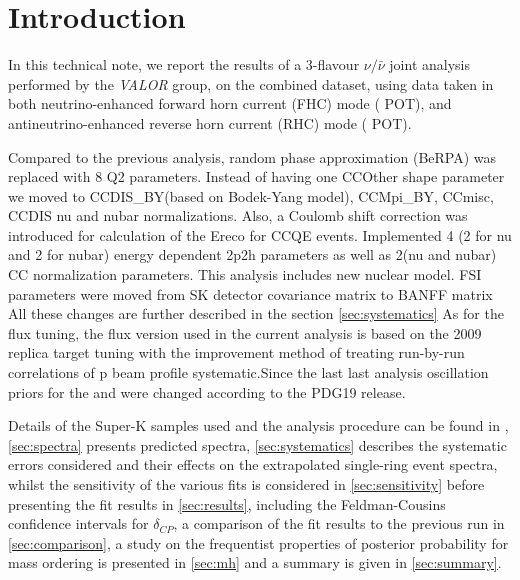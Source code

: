 
\section {Introduction}
\label{sec:intro}
In this technical note, we report the results of a 3-flavour $\nu/\bar{\nu}$ joint analysis performed by the {\em VALOR} group, on the combined \RunPeriod dataset, using data taken in both neutrino-enhanced forward horn current (FHC) mode (\TotalPotNu{} POT), and antineutrino-enhanced reverse horn current (RHC) mode (\TotalPotNuBar{} POT).


Compared to the previous analysis, random phase approximation  (BeRPA) was replaced with 8 Q2 parameters. Instead of having one CCOther shape parameter we moved to CCDIS_BY(based on Bodek-Yang model), CCMpi_BY, CCmisc, CCDIS nu and nubar normalizations. Also, a Coulomb shift correction was introduced for calculation of the Ereco for CCQE events. Implemented 4 (2 for nu and 2 for nubar) energy dependent 2p2h parameters as well as 2(nu and nubar) CC normalization parameters.  This analysis includes new nuclear model. FSI parameters were moved  from SK detector covariance matrix to BANFF matrix  All these changes are further described in the section \cref {sec:systematics}
As for the flux tuning, the flux version used in the current analysis is based on the 2009 replica target tuning with the improvement method  of treating run-by-run correlations of p beam profile systematic.Since the last last analysis oscillation priors for the \ssqthonethree and \ssqthonetwo were changed according to the PDG19  release. 




Details of the Super-K samples used and the analysis procedure can be found in \cite{OurRun18JointAnalysis3Flavour}, \cref{sec:spectra} presents predicted spectra, \cref{sec:systematics} describes the systematic errors considered and their effects on the extrapolated single-ring event spectra, whilst the sensitivity of the various fits is considered in \cref{sec:sensitivity} before presenting the fit results in \cref{sec:results}, including the Feldman-Cousins confidence intervals for $\delta_{CP}$, a comparison of the fit results to the previous run in \cref{sec:comparison}, \color{blue} a study on the frequentist properties of posterior probability for mass ordering is presented in \cref{sec:mh}\color{black} and a summary is given in \cref{sec:summary}.

\clearpage
